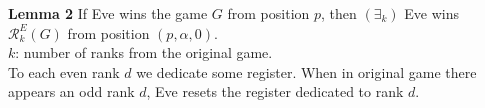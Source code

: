 \noindent
\textbf{Lemma 2} If Eve wins the game $G$ from position $p$,
then $(\exists_k)$ Eve wins $\mathcal{R}^E_k(G)$ from position $(p, \alpha, 0)$.\\
$k$: number of ranks from the original game.\\
To each even rank $d$ we dedicate some register. When in original game there appears
an odd rank $d$, Eve resets the register dedicated to rank $d$.